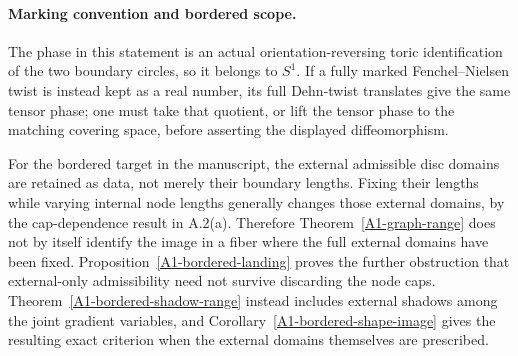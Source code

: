 \paragraph{Marking convention and bordered scope.}
The phase in this statement is an actual orientation-reversing toric
identification of the two boundary circles, so it belongs to $S^1$.
If a fully marked Fenchel--Nielsen twist is instead kept as a real
number, its full Dehn-twist translates give the same tensor phase;
one must take that quotient, or lift the tensor phase to the matching
covering space, before asserting the displayed diffeomorphism.

For the bordered target in the manuscript, the external admissible
disc domains are retained as data, not merely their boundary lengths.
Fixing their lengths while varying internal node lengths generally
changes those external domains, by the cap-dependence result in
A.2(a). Therefore Theorem~\ref{A1-graph-range} does not by itself
identify the image in a fiber where the full external domains have
been fixed. Proposition~\ref{A1-bordered-landing} proves the further
obstruction that external-only admissibility need not survive
discarding the node caps. Theorem~\ref{A1-bordered-shadow-range}
instead includes external shadows among the joint gradient variables,
and Corollary~\ref{A1-bordered-shape-image} gives the resulting exact
criterion when the external domains themselves are prescribed.
